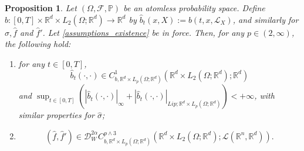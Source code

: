 \documentclass[10pt, a4paper]{article} %
\newcommand{\R}{\mathbb{R}}
\theoremstyle{definition}
\theoremstyle{plain}
\newtheorem{prop}[defn]{Proposition}
\begin{document}
\begin{prop} \label{prop:liftofstochasticcontrolledvectorfields}
    Let $(\Omega,\mathcal{F},\mathbb{P})$ be an atomless probability space.
    Define $\hat{b}:[0,T] \times \R^d \times L_2(\Omega;\R^d) \to \R^d$ by $\hat b_t (x,X) := b(t,x,\mathcal{L}_X)$, and similarly for $\hat \sigma, \hat f$ and $\hat f'$. 
    Let \cref{assumptions_existence} be in force. Then, for any $p \in (2,\infty)$, the following hold: \begin{enumerate}
        \item for any $t \in [0,T]$, 
        $$\hat b_t (\cdot , \cdot) \in C^1_{b, \R^d \times L_p(\Omega;\R^d)}(\R^d \times L_2(\Omega;\R^d);\R^d)$$ and $\sup_{t \in [0,T]} (|\hat b_t (\cdot , \cdot)|_{\infty} + |\hat b_t (\cdot , \cdot)|_{Lip;\R^d \times L_p(\Omega;\R^d)}) < +\infty$, with similar properties for $\hat \sigma$; 
    \item  \begin{equation*}
        (\hat{f},\hat{f}') \in \mathscr{D}_W^{2\alpha} C_{b,\R^d \times L_p(\Omega;\R^d)}^{p\wedge 3} (\R^d \times L_2(\Omega;\R^d); \mathscr{L}(\R^n,\R^d)) .
    \end{equation*}
    \end{enumerate}
\end{prop}
\end{document}

